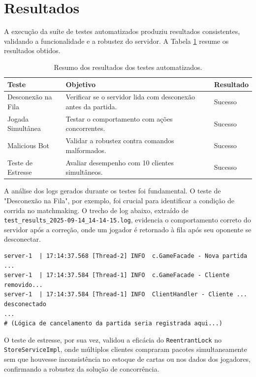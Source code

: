 \documentclass[12pt,a4paper]{article}
\begin{document}
\section{Resultados}
A execução da suíte de testes automatizados produziu resultados consistentes, validando a funcionalidade e a robustez do servidor. A Tabela \ref{tab:resultados} resume os resultados obtidos.

\begin{table}[h!]
\centering
\caption{Resumo dos resultados dos testes automatizados.}
\label{tab:resultados}
\begin{tabular}{p{3cm}p{7cm}l}
\toprule
Teste & Objetivo & Resultado \\ \midrule
Desconexão na Fila & Verificar se o servidor lida com desconexão antes da partida. & Sucesso \\
Jogada Simultânea & Testar o comportamento com ações concorrentes. & Sucesso \\
Malicious Bot & Validar a robustez contra comandos malformados. & Sucesso \\
Teste de Estresse & Avaliar desempenho com 10 clientes simultâneos. & Sucesso \\
\bottomrule
\end{tabular}
\end{table}

A análise dos logs gerados durante os testes foi fundamental. O teste de "Desconexão na Fila", por exemplo, foi crucial para identificar a condição de corrida no matchmaking. O trecho de log abaixo, extraído de \texttt{test\_results\_2025-09-14\_14-14-15.log}, evidencia o comportamento correto do servidor após a correção, onde um jogador é retornado à fila após seu oponente se desconectar.

\begin{small}
\begin{verbatim}
server-1  | 17:14:37.568 [Thread-2] INFO  c.GameFacade - Nova partida ...
server-1  | 17:14:37.584 [Thread-1] INFO  c.GameFacade - Cliente removido...
server-1  | 17:14:37.584 [Thread-1] INFO  ClientHandler - Cliente ... desconectado
...
# (Lógica de cancelamento da partida seria registrada aqui...)
\end{verbatim}
\end{small}

O teste de estresse, por sua vez, validou a eficácia do \texttt{ReentrantLock} no \texttt{StoreServiceImpl}, onde múltiplos clientes compraram pacotes simultaneamente sem que houvesse inconsistência no estoque de cartas ou nos dados dos jogadores, confirmando a robustez da solução de concorrência.
\end{document}
